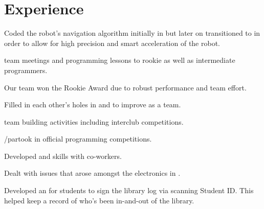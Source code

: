 \documentclass[dvipsnames]{deedy-resume-openfont}
\begin{document}
  \hfill
  \begin{minipage}[t]{0.67\textwidth} 


  \section{Experience}

  \vspace{\topsep} %
  \begin{tightemize}
  \item Coded the robot's navigation algorithm initially in  but later on transitioned to  in order to allow for high precision and smart acceleration of the robot.
  \item {} team meetings and  programming lessons to rookie as well as intermediate programmers.
  \item Our team won the Rookie Award due to robust performance and team effort.
  \end{tightemize}
  \sectionsep

  \begin{tightemize}
  \item Filled in each other's holes in  and  to improve as a team.
  \item {} team building activities including interclub competitions.
  \item {}/partook in official programming competitions.
  \end{tightemize}
  \sectionsep

  \begin{tightemize}
  \item Developed  and  skills with co-workers.
  \item Dealt with issues that arose amongst the electronics in .
  \item Developed an  for students to sign the library log via scanning Student ID. This  helped keep a record of who's been in-and-out of the library.
  \end{tightemize}
  \sectionsep


\end{minipage}
\end{document}
